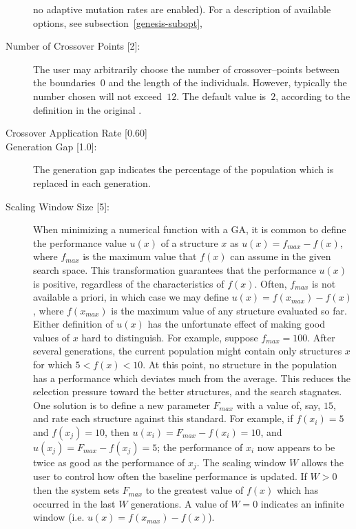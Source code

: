 \begin{description}
	no adaptive mutation rates are enabled).
	For a description of available options, see 
	subsection~\ref{genesis-subopt},
%
\item[	Number of Crossover Points {[2]}:]
	The user may arbitrarily choose the number of cross\-over--points 
	between the boundaries~$0$ and the length of the individuals.
	However, typically the number chosen will not exceed~$12$.
	The default value is~$2$, according to the definition in the 
	original \Ogen.
%
\item[	Crossover Application Rate {[0.60]}]{}
%
\item[	Generation Gap {[1.0]}:]
       	The generation gap indicates the percentage of  the  population 
	which is replaced in each generation.
%
\item[	Scaling Window Size {[5]}:]
       	When minimizing a numerical function with a GA, it is common
       	to  define  the  performance  value $u(x)$ of a structure $x$ as
       	$u(x) = f_{max} - f(x)$, where $f_{max}$ is the maximum  value  that
       	$f(x)$ can assume in the given search space.  This transformation 
	guarantees  that  the  performance  $u(x)$  is  positive,
       	regardless  of the characteristics of $f(x)$.  Often, $f_{max}$ is
       	not available a priori, in which case we may define  $u(x)  =
       	f(x_{max})  - f(x)$, where $f(x_{max})$ is the maximum value of any
       	structure evaluated so far.  Either definition of  $u(x)$  has
       	the  unfortunate  effect  of making good values of $x$ hard to
       	distinguish.  For  example,  suppose  $f_{max}  =  100$.   After
       	several  generations,  the  current population might contain
       	only structures $x$ for which $5 < f(x) < 10$.  At  this  point,
      	no structure in the population has a performance which deviates 
	much from the  average.   This  reduces  the  selection
       	pressure  toward the better structures, and the search stagnates.  
	One solution is to define a new parameter $F_{max}$ with
       	a  value  of,  say, $15$, and rate each structure against this
       	standard. For example, if $f(x_i) = 5$ and  $f(x_j)  =  10$,  then
       	$u(x_i)  =  F_{max} - f(x_i) = 10$, and $u(x_j) = F_{max} - f(x_j) = 5$;
       	the performance of $x_i$ now appears to be twice as good as the
       	performance  of $x_j$.  The scaling window $W$ allows the user to
       	control how often the baseline performance is updated.  If $W > 0$
	then the system sets $F_{max}$ to the greatest value of $f(x)$
       	which has occurred in the last $W$ generations.  A value of  $W =  0$
  	indicates  an  infinite  window  (i.e. $u(x) = f(x_{max}) -f(x)$).
	

\end{description}
